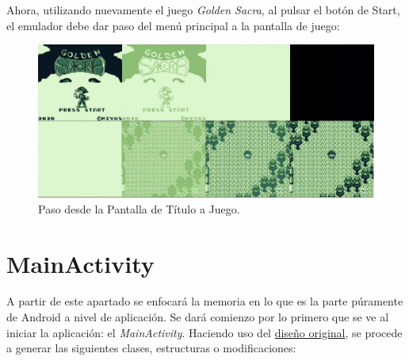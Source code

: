 Ahora, utilizando nuevamente el juego \textit{Golden Sacra}, al pulsar el botón de Start, el emulador debe dar paso del menú principal a la pantalla de juego:

\begin{figure}[H]
    \centering
    \includegraphics[width=1\textwidth]{include/images/transition_title.png}
    \caption{Paso desde la Pantalla de Título a Juego.}\label{figure:transition_title}
\end{figure}

\section{MainActivity}

A partir de este apartado se enfocará la memoria en lo que es la parte púramente de Android a nivel de aplicación. Se dará comienzo por lo primero que se ve al iniciar la aplicación: el \textit{MainActivity}.
\clearpage
Haciendo uso del \hyperref[figure:mockupmenu]{diseño original}, se procede a generar las siguientes clases, estructuras o modificaciones:


